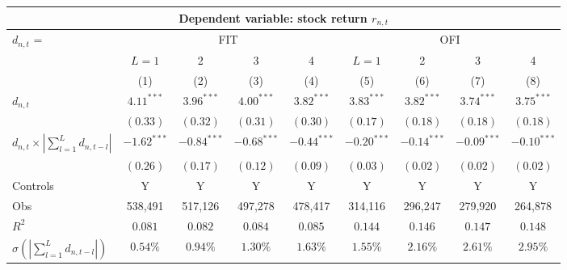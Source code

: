 \begin{tabular}{lcccccccc}
  \hline \multicolumn{9}{c}{Dependent variable: stock return $r_{n,t}$} \\

                          \hline $d_{n,t}$ = & \multicolumn{4}{c}{FIT} & \multicolumn{4}{c}{OFI} \\
 \cmidrule(l){2-5} \cmidrule(l){6-9}  & $L = 1$ & 2 & 3 & 4 & $L = 1$ & 2 & 3 & 4 \\
 \cmidrule(l){2-5} \cmidrule(l){6-9} \vspace{5pt} & (1) & (2) & (3) & (4) & (5) & (6) & (7) & (8) \\ 
  $d_{n,t}$ & $4.11^{***}$ & $3.96^{***}$ & $4.00^{***}$ & $3.82^{***}$ & $3.83^{***}$ & $3.82^{***}$ & $3.74^{***}$ & $3.75^{***}$ \\ 
   & $(0.33)$ & $(0.32)$ & $(0.31)$ & $(0.30)$ & $(0.17)$ & $(0.18)$ & $(0.18)$ & $(0.18)$ \\ 
  $d_{n,t} \times |\sum_{l=1}^L d_{n,t-l}|$ & $-1.62^{***}$ & $-0.84^{***}$ & $-0.68^{***}$ & $-0.44^{***}$ & $-0.20^{***}$ & $-0.14^{***}$ & $-0.09^{***}$ & $-0.10^{***}$ \\ 
   \vspace{5pt} & $(0.26)$ & $(0.17)$ & $(0.12)$ & $(0.09)$ & $(0.03)$ & $(0.02)$ & $(0.02)$ & $(0.02)$ \\ 
  Controls & Y & Y & Y & Y & Y & Y & Y & Y \\ 
  Obs & 538,491 & 517,126 & 497,278 & 478,417 & 314,116 & 296,247 & 279,920 & 264,878 \\ 
   \vspace{5pt}$R^2$ & $0.081$ & $0.082$ & $0.084$ & $0.085$ & $0.144$ & $0.146$ & $0.147$ & $0.148$ \\ 
  $\sigma(|\sum_{l=1}^L d_{n,t-l}|)$ & $0.54 \%$ & $0.94 \%$ & $1.30 \%$ & $1.63 \%$ & $1.55 \%$ & $2.16 \%$ & $2.61 \%$ & $2.95 \%$ \\ 
   \hline 
\end{tabular}
